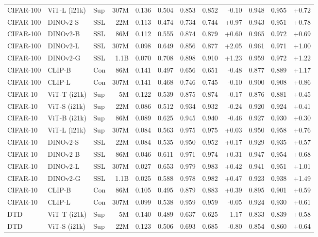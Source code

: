 \begin{table}[!htbp]
\begin{tabular}{lllrrr|rrr|rrr}
CIFAR-100 & ViT-L (i21k) & Sup & 307M & 0.136 & 0.504 & 0.853 & 0.852 & -0.10 & 0.948 & 0.955 & +0.72 \\
CIFAR-100 & DINOv2-S & SSL & 22M & 0.113 & 0.474 & 0.734 & 0.744 & +0.97 & 0.943 & 0.951 & +0.78 \\
CIFAR-100 & DINOv2-B & SSL & 86M & 0.112 & 0.555 & 0.874 & 0.879 & +0.60 & 0.965 & 0.972 & +0.69 \\
CIFAR-100 & DINOv2-L & SSL & 307M & 0.098 & 0.649 & 0.856 & 0.877 & +2.05 & 0.961 & 0.971 & +1.00 \\
CIFAR-100 & DINOv2-G & SSL & 1.1B & 0.070 & 0.708 & 0.898 & 0.910 & +1.23 & 0.959 & 0.972 & +1.22 \\
CIFAR-100 & CLIP-B & Con & 86M & 0.141 & 0.497 & 0.656 & 0.651 & -0.48 & 0.877 & 0.889 & +1.17 \\
CIFAR-100 & CLIP-L & Con & 307M & 0.141 & 0.468 & 0.746 & 0.745 & -0.10 & 0.900 & 0.908 & +0.86 \\
\midrule
CIFAR-10 & ViT-T (i21k) & Sup & 5M & 0.122 & 0.539 & 0.875 & 0.874 & -0.17 & 0.876 & 0.881 & +0.45 \\
CIFAR-10 & ViT-S (i21k) & Sup & 22M & 0.086 & 0.512 & 0.934 & 0.932 & -0.24 & 0.920 & 0.924 & +0.41 \\
CIFAR-10 & ViT-B (i21k) & Sup & 86M & 0.089 & 0.625 & 0.945 & 0.940 & -0.46 & 0.927 & 0.930 & +0.30 \\
CIFAR-10 & ViT-L (i21k) & Sup & 307M & 0.084 & 0.563 & 0.975 & 0.975 & +0.03 & 0.950 & 0.958 & +0.76 \\
CIFAR-10 & DINOv2-S & SSL & 22M & 0.084 & 0.535 & 0.950 & 0.952 & +0.17 & 0.929 & 0.935 & +0.57 \\
CIFAR-10 & DINOv2-B & SSL & 86M & 0.046 & 0.611 & 0.971 & 0.974 & +0.31 & 0.947 & 0.954 & +0.68 \\
CIFAR-10 & DINOv2-L & SSL & 307M & 0.027 & 0.653 & 0.979 & 0.983 & +0.42 & 0.941 & 0.951 & +1.01 \\
CIFAR-10 & DINOv2-G & SSL & 1.1B & 0.025 & 0.588 & 0.978 & 0.982 & +0.47 & 0.923 & 0.938 & +1.49 \\
CIFAR-10 & CLIP-B & Con & 86M & 0.105 & 0.495 & 0.879 & 0.883 & +0.39 & 0.895 & 0.901 & +0.59 \\
CIFAR-10 & CLIP-L & Con & 307M & 0.099 & 0.538 & 0.959 & 0.959 & -0.05 & 0.924 & 0.930 & +0.61 \\
\midrule
DTD & ViT-T (i21k) & Sup & 5M & 0.140 & 0.489 & 0.637 & 0.625 & -1.17 & 0.833 & 0.839 & +0.58 \\
DTD & ViT-S (i21k) & Sup & 22M & 0.123 & 0.506 & 0.693 & 0.685 & -0.80 & 0.854 & 0.860 & +0.64 \\

\end{tabular}
\end{table}
